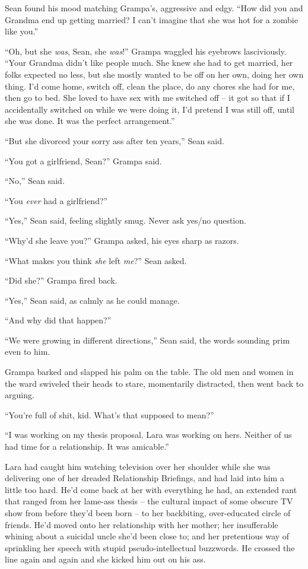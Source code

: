 Sean found his mood matching Grampa's, aggressive and edgy. “How did 
you and Grandma end up getting married? I can't imagine that she was 
hot for a zombie like you.”

“Oh, but she \emph{was}, Sean, she \emph{was}!” Grampa waggled his 
eyebrows lasciviously. “Your Grandma didn't like people much. She 
knew she had to get married, her folks expected no less, but she mostly 
wanted to be off on her own, doing her own thing. I'd come home, switch 
off, clean the place, do any chores she had for me, then go to bed. She 
loved to have sex with me switched off -- it got so that if I 
accidentally switched on while we were doing it, I'd pretend I was 
still off, until she was done. It was the perfect arrangement.”

“But she divorced your sorry ass after ten years,” Sean said.

“You got a girlfriend, Sean?” Grampa said.

“No,” Sean said.

“You \emph{ever} had a girlfriend?”

“Yes,” Sean said, feeling slightly smug. Never ask yes/no question.

“Why'd she leave you?” Grampa asked, his eyes sharp as razors.

“What makes you think \emph{she} left \emph{me}?” Sean asked.

“Did she?” Grampa fired back.

“Yes,” Sean said, as calmly as he could manage.

“And why did that happen?”

“We were growing in different directions,” Sean said, the words 
sounding prim even to him.

Grampa barked and slapped his palm on the table. The old men and women 
in the ward swiveled their heads to stare, momentarily distracted, then 
went back to arguing.

“You're full of shit, kid. What's that supposed to mean?”

“I was working on my thesis proposal. Lara was working on hers. 
Neither of us had time for a relationship. It was amicable.”

Lara had caught him watching television over her shoulder while she was 
delivering one of her dreaded Relationship Briefings, and had laid into 
him a little too hard. He'd come back at her with everything he had, an 
extended rant that ranged from her lame-ass thesis -- the cultural 
impact of some obscure TV show from before they'd been born -- to her 
backbiting, over-educated circle of friends. He'd moved onto her 
relationship with her mother; her insufferable whining about a suicidal 
uncle she'd been close to; and her pretentious way of sprinkling her 
speech with stupid pseudo-intellectual buzzwords. He crossed the line 
again and again and she kicked him out on his ass.

